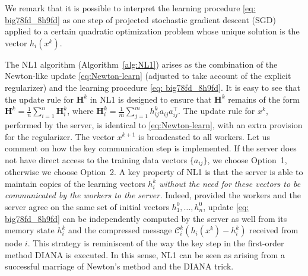 \documentclass[10pt]{article}
\newcommand{\newalpha}{h}
\newcommand{\mH}{\mathbf{H}}
\newcommand{\cC}{{\mathcal{C}}}
\begin{document}
We remark that it is possible to interpret the learning procedure \eqref{eq: big78fd_8h9fd}  as one step of projected stochastic gradient descent (SGD)  applied to a certain quadratic optimization problem whose unique solution is the vector $\newalpha_i(x^k)$. 



The {\sf NL1} algorithm (Algorithm~\ref{alg:NL1}) arises as the combination of the Newton-like update \eqref{eq:Newton-learn} (adjusted to take account of the explicit regularizer) and the learning procedure \eqref{eq: big78fd_8h9fd}. It is easy to see that the update rule for $\mH^k$ in {\sf NL1} is designed to ensure that $\mH^k$ remains of the form  $\mH^k = \frac{1}{n}\sum_{i=1}^n \mH^k_i$, where $\mH^k_i = \frac{1}{m} \sum_{j=1}^{m} h^k_{ij} a_{ij}a_{ij}^\top$. The update rule for $x^k$, performed by the server, is identical to \eqref{eq:Newton-learn},  with an extra provision for the regularizer. The vector $x^{k+1}$ is broadcasted to all workers. Let us comment on how the key communication step is implemented. If the server does not have direct access to the training data vectors $\{a_{ij} \}$, we choose Option~1, otherwise we choose Option~2. A key property of {\sf NL1} is that the server is able to maintain  copies of the learning vectors $h_i^k$ {\em without the need for these vectors to be communicated by the workers to the server.} Indeed, provided the workers and the server agree on the same set of initial vectors $h_1^0, \dots, h_n^0$, update \eqref{eq: big78fd_8h9fd} can be independently computed by  the server as well from its memory state $h_i^k$ and the compressed message $\cC_i^k (\newalpha_i(x^k) - h^k_i)$ received from node $i$. This strategy is reminiscent of the way the key step in the first-order method DIANA \citep{DIANA, DIANA2} is executed. In this sense, {\sf NL1} can be seen as arising from a successful marriage of Newton's method and the DIANA trick.
\end{document}
